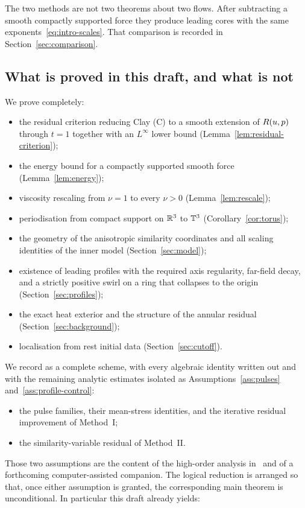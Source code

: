 The two methods are not two theorems about two flows. After subtracting a smooth compactly supported force they produce leading cores with the same exponents~\eqref{eq:intro-scales}. That comparison is recorded in Section~\ref{sec:comparison}.

\subsection{What is proved in this draft, and what is not}
\label{sec:intro-status}

We prove completely:
\begin{itemize}[leftmargin=1.4em]
\item the residual criterion reducing {C}lay (C) to a smooth extension of $R(u,p)$ through $t=1$ together with an $L^\infty$ lower bound (Lemma~\ref{lem:residual-criterion});
\item the energy bound for a compactly supported smooth force
(Lemma~\ref{lem:energy});
\item viscosity rescaling from $\nu=1$ to every $\nu>0$ (Lemma~\ref{lem:rescale});
\item periodisation from compact support on $\mathbb{R}^3$ to $\mathbb{T}^3$ (Corollary~\ref{cor:torus});
\item the geometry of the anisotropic similarity coordinates and all scaling identities of the inner model (Section~\ref{sec:model});
\item existence of leading profiles with the required axis regularity, far-field decay, and a strictly positive swirl on a ring that collapses to the origin (Section~\ref{sec:profiles});
\item the exact heat exterior and the structure of the annular residual (Section~\ref{sec:background});
\item localisation from rest initial data (Section~\ref{sec:cutoff}).
\end{itemize}
We record as a complete scheme, with every algebraic identity written out and with the remaining analytic estimates isolated as Assumptions~\ref{ass:pulses} and~\ref{ass:profile-control}:
\begin{itemize}[leftmargin=1.4em]
\item the pulse families, their mean-stress identities, and the iterative residual improvement of Method~I;
\item the similarity-variable residual of Method~II.
\end{itemize}
Those two assumptions are the content of the high-order analysis in~\cite{openai2026ns} and of a forthcoming computer-assisted companion. The logical reduction is arranged so that, once either assumption is granted, the corresponding main theorem is unconditional. In particular this draft already yields:

